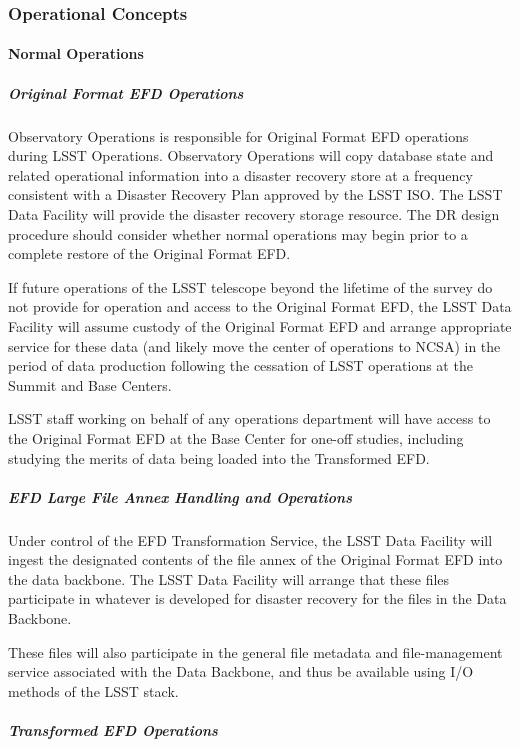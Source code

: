 \subsubsection{Operational Concepts}

\paragraph{Normal Operations}

\subparagraph{Original Format EFD Operations}

Observatory Operations is responsible for Original Format EFD
operations during LSST Operations. Observatory
Operations will copy database state and related operational
information into a disaster recovery store at a frequency consistent
with a Disaster Recovery Plan approved by the LSST ISO. The LSST Data
Facility will provide the disaster recovery storage resource. The DR
design procedure should consider whether normal operations may begin
prior to a complete restore of the Original Format EFD.

If future operations of the LSST telescope beyond the lifetime of the
survey do not provide for operation and access to the Original Format
EFD, the LSST Data Facility will assume custody of the Original Format
EFD and arrange appropriate service for these data (and likely move
the center of operations to NCSA) in the period of data production
following the cessation of LSST operations at the Summit and Base
Centers.

LSST staff working on behalf of any operations department will have
access to the Original Format EFD at the Base Center for one-off
studies, including studying the merits of data being loaded into the
Transformed EFD.

\subparagraph{EFD Large File Annex Handling and Operations}

Under control of the EFD Transformation Service, the LSST Data Facility will
ingest the designated contents of the file annex of the Original
Format EFD into the data backbone. The LSST Data Facility will arrange that these
files participate in whatever is developed for disaster recovery for the
files in the Data Backbone.

These files will also participate in the general file metadata and
file-management service associated with the Data Backbone, and thus be
available using I/O methods of the LSST stack.

\subparagraph{Transformed EFD Operations}

